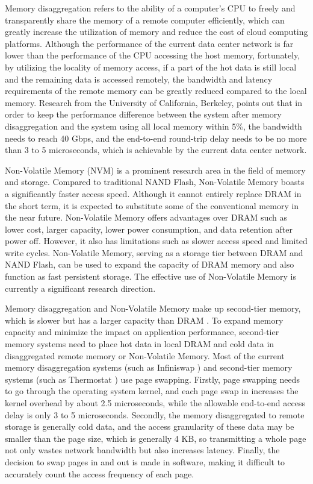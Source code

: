 Memory disaggregation refers to the ability of a computer's CPU to freely and transparently share the memory of a remote computer efficiently, which can greatly increase the utilization of memory and reduce the cost of cloud computing platforms.
Although the performance of the current data center network is far lower than the performance of the CPU accessing the host memory, fortunately, by utilizing the locality of memory access, if a part of the hot data is still local and the remaining data is accessed remotely, the bandwidth and latency requirements of the remote memory can be greatly reduced compared to the local memory. Research from the University of California, Berkeley, points out that in order to keep the performance difference between the system after memory disaggregation and the system using all local memory within 5\%, the bandwidth needs to reach 40 Gbps, and the end-to-end round-trip delay needs to be no more than 3 to 5 microseconds, which is achievable by the current data center network.

Non-Volatile Memory (NVM) is a prominent research area in the field of memory and storage. Compared to traditional NAND Flash, Non-Volatile Memory boasts a significantly faster access speed. Although it cannot entirely replace DRAM in the short term, it is expected to substitute some of the conventional memory in the near future. Non-Volatile Memory offers advantages over DRAM such as lower cost, larger capacity, lower power consumption, and data retention after power off. However, it also has limitations such as slower access speed and limited write cycles. Non-Volatile Memory, serving as a storage tier between DRAM and NAND Flash, can be used to expand the capacity of DRAM memory and also function as fast persistent storage. The effective use of Non-Volatile Memory is currently a significant research direction.

Memory disaggregation and Non-Volatile Memory make up second-tier memory, which is slower but has a larger capacity than DRAM \cite{dulloor2016data}. To expand memory capacity and minimize the impact on application performance, second-tier memory systems need to place hot data in local DRAM and cold data in disaggregated remote memory or Non-Volatile Memory. Most of the current memory disaggregation systems (such as Infiniswap \cite{gu2017efficient}) and second-tier memory systems (such as Thermostat \cite{agarwal2017thermostat}) use page swapping. Firstly, page swapping needs to go through the operating system kernel, and each page swap in increases the kernel overhead by about 2.5 microseconds, while the allowable end-to-end access delay is only 3 to 5 microseconds. Secondly, the memory disaggregated to remote storage is generally cold data, and the access granularity of these data may be smaller than the page size, which is generally 4 KB, so transmitting a whole page not only wastes network bandwidth but also increases latency. Finally, the decision to swap pages in and out is made in software, making it difficult to accurately count the access frequency of each page.

